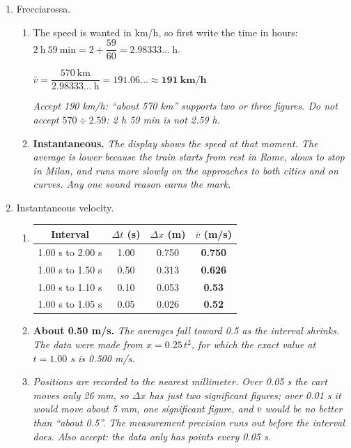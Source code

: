 \documentclass[12pt, twoside]{article}
\begin{document}
\begin{enumerate}[itemsep=0.4cm]
\item Frecciarossa.
  \begin{enumerate}[itemsep=0.2cm]
    \item The speed is wanted in km/h, so first write the time in hours:
      $2~\text{h}~59~\text{min} = 2 + \dfrac{59}{60} = 2.98333\ldots~\text{h}$.

      $\bar{v} = \dfrac{570~\text{km}}{2.98333\ldots~\text{h}} = 191.06\ldots
      \approx \mathbf{191~\textbf{km/h}}$

      \emph{Accept 190 km/h: ``about 570 km'' supports two or three figures. Do not
      accept $570 \div 2.59$: 2 h 59 min is not 2.59 h.}
    \item \textbf{Instantaneous.} \emph{The display shows the speed at that moment.
      The average is lower because the train starts from rest in Rome, slows to stop
      in Milan, and runs more slowly on the approaches to both cities and on curves.
      Any one sound reason earns the mark.}
  \end{enumerate}

\newpage

\item Instantaneous velocity.
  \begin{enumerate}[itemsep=0.25cm]
    \item \renewcommand{\arraystretch}{1.35}
      \begin{tabular}[t]{| c | c | c | c |}
        \hline
        Interval & $\Delta t$ (s) & $\Delta x$ (m) & $\bar{v}$ (m/s) \\ \hline
        1.00 s to 2.00 s & 1.00 & 0.750 & \textbf{0.750} \\ \hline
        1.00 s to 1.50 s & 0.50 & 0.313 & \textbf{0.626} \\ \hline
        1.00 s to 1.10 s & 0.10 & 0.053 & \textbf{0.53} \\ \hline
        1.00 s to 1.05 s & 0.05 & 0.026 & \textbf{0.52} \\ \hline
      \end{tabular}
    \item \textbf{About 0.50 m/s.} \emph{The averages fall toward 0.5 as the interval
      shrinks. The data were made from $x = 0.25\,t^2$, for which the exact value at
      $t = 1.00$ s is 0.500 m/s.}
    \item \emph{Positions are recorded to the nearest millimeter. Over 0.05 s the cart
      moves only 26 mm, so $\Delta x$ has just two significant figures; over 0.01 s it
      would move about 5 mm, one significant figure, and $\bar{v}$ would be no better
      than ``about 0.5''. The measurement precision runs out before the interval does.
      Also accept: the data only has points every 0.05 s.}
  \end{enumerate}


\end{enumerate}
\end{document}
